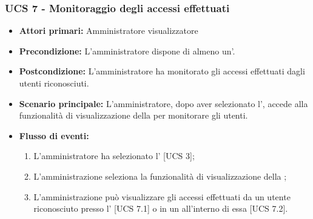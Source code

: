\subsubsection{UCS 7 - Monitoraggio degli accessi effettuati}

\begin{itemize}
\item \textbf{Attori primari:} Amministratore visualizzatore
\item \textbf{Precondizione:} L'amministratore dispone di almeno un'.
\item \textbf{Postcondizione:} L'amministratore ha monitorato gli accessi effettuati dagli utenti riconosciuti.
\item \textbf{Scenario principale:} L'amministratore, dopo aver selezionato l', accede alla funzionalità di visualizzazione della  per monitorare gli utenti.
\item \textbf{Flusso di eventi:} 
\begin{enumerate}
	\item L'amministratore ha selezionato l' [UCS 3];
	\item L'amministrazione seleziona la funzionalità di visualizzazione della ;
	\item L'amministrazione può visualizzare gli accessi effettuati da un utente riconosciuto presso l' [UCS 7.1] o in un  all'interno di essa [UCS 7.2].
\end{enumerate}
\end{itemize}

